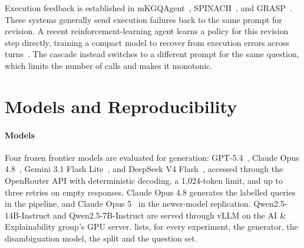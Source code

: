 Execution feedback is established in mKGQAgent~\parencite{perevalov2025mkgqagent}, SPINACH~\parencite{liu2024spinach}, and GRASP~\parencite{walter2025grasp}.
These systems generally send execution failures back to the same prompt for revision.
A recent reinforcement-learning agent learns a policy for this revision step directly, training a compact model to recover from execution errors across turns~\parencite{vossebeld2025refine}.
The cascade instead switches to a different prompt for the same question, which limits the number of calls and makes it monotonic.

\section{Models and
Reproducibility}

\label{sec:setup-repro}

\paragraph{Models}

Four frozen frontier models are evaluated for generation: GPT-5.4~\citep{openai2026gpt54}, Claude Opus 4.8~\citep{anthropic2026opus48}, Gemini 3.1 Flash Lite~\citep{googledeepmind2026gemini31}, and DeepSeek V4 Flash~\citep{deepseekai2026v4}, accessed through the OpenRouter API with deterministic decoding, a 1,024-token limit, and up to three retries on empty responses.
Claude Opus 4.8 generates the labelled queries in the pipeline, and Claude Opus 5~\citep{anthropic2026opus5} in the newer-model replication.
Qwen2.5-14B-Instruct and Qwen2.5-7B-Instruct are served through vLLM on the AI \& Explainability group's GPU server.
 lists, for every experiment, the generator, the disambiguation model, the split and the question set.

